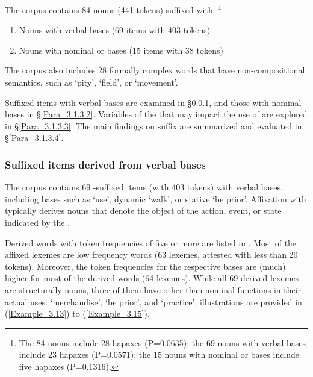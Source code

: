 The corpus contains 84 nouns (441 tokens) suffixed with \textitbf{-}:\footnote{The 84 nouns include 28 hapaxes (P=0.0635); the 69 nouns with verbal bases include 23 hapaxes (P=0.0571); the 15 nouns with nominal or  bases include five hapaxes (P=0.1316).}


\begin{enumerate}
\item 
Nouns with verbal bases (69 items with 403 tokens)
\item 
Nouns with nominal or  bases (15 items with 38 tokens)
\end{enumerate}

The corpus also includes 28 formally complex words that have non-comp\-os\-ition\-al semantics, such as  ‘pity’,  ‘field’, or  ‘movement’.



Suffixed items with verbal bases are examined in §\ref{Para_3.1.3.1}, and those with nominal bases in §\ref{Para_3.1.3.2}. Variables of the  that may impact the use of  are explored in §\ref{Para_3.1.3.3}. The main findings on suffix  are summarized and evaluated in §\ref{Para_3.1.3.4}.


\subsubsection[Suffixed items derived from verbal bases]{Suffixed items derived from verbal bases}\label{Para_3.1.3.1}

The corpus contains 69 -suffixed items (with 403 tokens) with verbal bases, including bases such as   ‘use’,  dynamic  ‘walk’, or  stative  ‘be prior’. Affixation with  typically derives nouns that denote the object of the action, event, or state indicated by the .



Derived words with token frequencies of five or more are listed in . Most of the affixed lexemes are low frequency words (63 lexemes, attested with less than 20 tokens). Moreover, the token frequencies for the respective bases are (much) higher for most of the derived words (64 lexemes). While all 69 derived lexemes are structurally nouns, three of them have other than nominal functions in their actual uses:  ‘merchandise’,  ‘be prior’, and  ‘practice'; illustrations are provided in (\ref{Example_3.13}) to (\ref{Example_3.15}).



